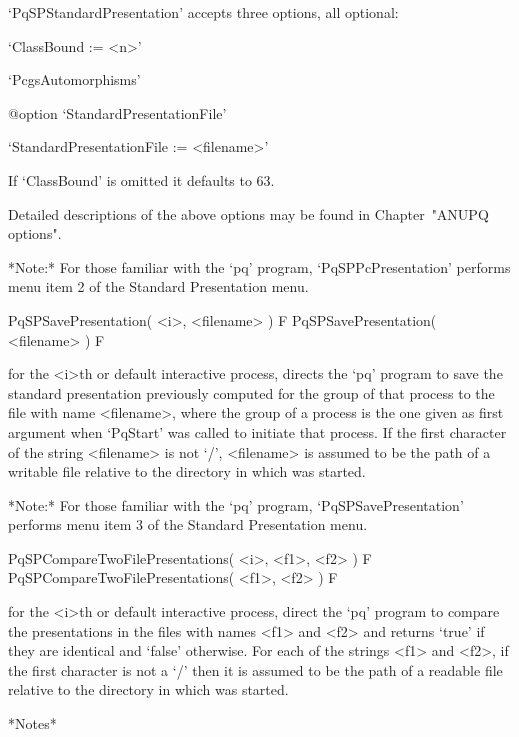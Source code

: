 `PqSPStandardPresentation' accepts three options, all optional:

\beginlist%

\item{}`ClassBound := <n>'

\item{}`PcgsAutomorphisms'

%
{@option \noexpand`StandardPresentationFile'}
\item{}`StandardPresentationFile := <filename>'

\endlist

If `ClassBound' is omitted it defaults to 63.

Detailed descriptions of the above options may be found in Chapter~"ANUPQ
options".

*Note:* For those familiar with  the  `pq'  program,  `PqSPPcPresentation'
performs menu item 2 of the Standard Presentation menu.

\>PqSPSavePresentation( <i>, <filename> ) F
\>PqSPSavePresentation( <filename> ) F

for the <i>th or default interactive {\ANUPQ} process, directs  the  `pq'
program to save the standard  presentation  previously  computed  for  the
group of that process to the file with name <filename>, where  the  group
of a process is the one given as first argument when `PqStart' was called
to initiate that process. If the first character of the string <filename>
is not `/', <filename> is assumed to be  the  path  of  a  writable  file
relative to the directory in which {\GAP} was started.

*Note:* For those familiar with the `pq'  program,  `PqSPSavePresentation'
performs menu item 3 of the Standard Presentation menu.

\>PqSPCompareTwoFilePresentations( <i>, <f1>, <f2> ) F
\>PqSPCompareTwoFilePresentations( <f1>, <f2> ) F

for the <i>th or default interactive {\ANUPQ} process, direct  the  `pq'
program to compare the presentations in the files with names <f1> and <f2>
and returns `true' if they are identical and `false' otherwise. For  each
of the strings <f1> and <f2>, if the first character is not a `/' then it
is assumed to be the path of a readable file relative to the directory in
which {\GAP} was started.

*Notes*

